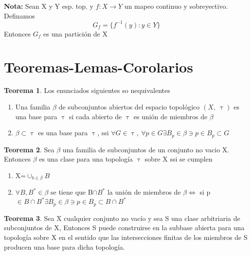 \documentclass{article}
\theoremstyle{definition}
\newtheorem{theorem}{Teorema}[section]
\begin{document}
\textbf{Nota: }
Sean X y Y esp. top. y $f:X\to Y$ un mapeo continuo y sobreyectivo. Definamos
\[G_f=\{f^{-1}(y):y\in Y\}\]
Entonces $G_f$ es una partición de X 






















\newpage
\section{Teoremas-Lemas-Corolarios}
\begin{theorem}
	Los enunciados siguientes so nequivalentes
	\begin{enumerate}
		\item Una familia $\beta$ de subconjuntos abiertos del espacio topológico $(X,\ \uptau)$ es una base para $\uptau$ si cada abierto de $\uptau$ es unión de miembros de $\beta$
		\item $\beta\subset\uptau$ es una base para $\uptau$, ssi $\forall G\in \uptau,\ \forall p\in G \exists B_p\in\beta\ni p\in B_p\subset G$ 
	\end{enumerate}
\end{theorem}


\begin{theorem}
	 Sea $\beta$ una familia de subconjuntos de un conjunto no vacio X. Entonces $\beta$ es una clase para una topología $\uptau$ sobre X ssi se cumplen 
	 \begin{enumerate}
	 \item X=$\cup_{b\in\beta} B$
	 \item $\forall B, B^*\in\beta$ se tiene que B$\cap B^*$ la unión de miembros de $\beta \Leftrightarrow$ si p$\in B\cap B^*\exists B_p\in\beta\ni p\in B_p\subset B\cap B^*$ 
	 \end{enumerate}
\end{theorem}


\begin{theorem}
	Sea X cualquier conjunto no vacío y sea S una clase arbitriaria de subconjuntos de X, Entonces S puede construirse en la subbase abierta para una topología sobre X en el sentido que las intersecciones finitas de los miembros de S producen una base para dicha topología.
\end{theorem}
\end{document}
